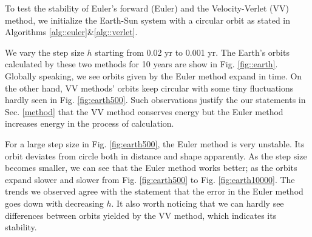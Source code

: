 To test the stability of Euler's forward (Euler) and the Velocity-Verlet (VV) method, we initialize the Earth-Sun system with a circular orbit as stated in Algorithms \ref{alg::euler}\&\ref{alg::verlet}.

We vary the step size $h$ starting from 0.02 yr to 0.001 yr.
The Earth's orbits calculated by these two methods for 10 years are show in Fig. \ref{fig::earth}. 
Globally speaking, we see orbits given by the Euler method expand in time.  
On the other hand, VV methods' orbits keep circular with some tiny fluctuations hardly seen in Fig. \ref{fig:earth500}.
Such observations justify the our statements in Sec. \ref{method} that the VV method conserves energy but the Euler method increases energy in the process of calculation.

For a large step size in Fig. \ref{fig:earth500}, the Euler method is very unstable. Its orbit deviates from circle both in distance and shape apparently. 
As the step size becomes smaller, we can see that the Euler method works better; as the orbits expand slower and slower from Fig. \ref{fig:earth500} to Fig. \ref{fig:earth10000}.
 The trends we observed agree with the statement that the error in the Euler method goes down with decreasing $h$. 
 It also worth noticing that we can hardly see differences between orbits yielded by the VV method, which indicates its stability.
 
